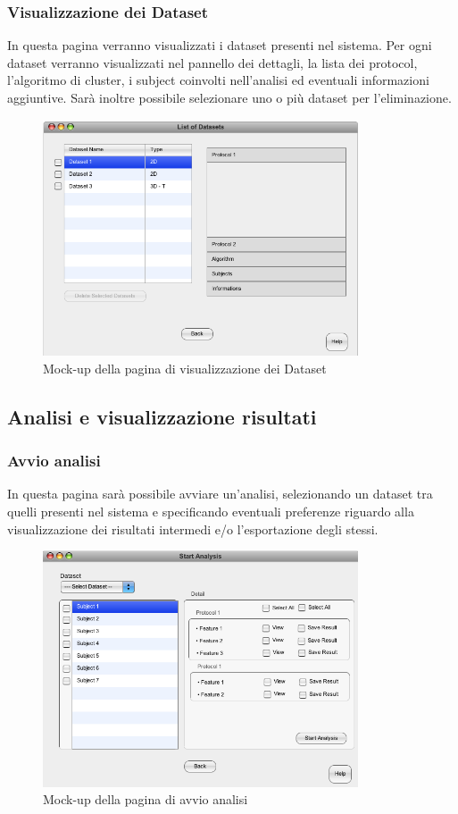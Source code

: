 \subsubsection{Visualizzazione dei Dataset}
In questa pagina verranno visualizzati i dataset\glossario{} presenti nel sistema. Per ogni dataset\glossario{} verranno visualizzati nel pannello dei dettagli, la lista dei protocol\glossario{}, l'algoritmo di cluster\glossario{}, i subject\glossario{} coinvolti nell'analisi ed eventuali informazioni aggiuntive.
Sarà inoltre possibile selezionare uno o più dataset\glossario{} per l'eliminazione.
\begin{figure}[htp]
	\centering
	\includegraphics[width=0.8\linewidth,height=7cm]{./Content/Immagini/Prototype-v0.1/filesystemdoc_8_9}
	\caption{Mock-up della pagina di visualizzazione dei Dataset}
	\label{view_dataset}
\end{figure}
\pagebreak
\subsection{Analisi e visualizzazione risultati}
\subsubsection{Avvio analisi}
In questa pagina sarà possibile avviare un'analisi, selezionando un dataset\glossario{} tra quelli presenti nel sistema e specificando eventuali preferenze riguardo alla visualizzazione dei risultati intermedi e/o l'esportazione degli stessi.
\begin{figure}[htp]
	\centering
	\includegraphics[width=0.8\linewidth,height=7cm]{./Content/Immagini/Prototype-v0.1/filesystemdoc_8_10}
	\caption{Mock-up della pagina di avvio analisi}
	\label{start_analysis}
\end{figure}

